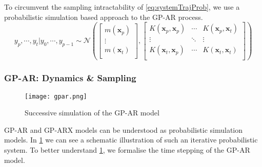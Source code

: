 To circumvent the sampling intractability of \cref{eq:systemTrajProb}, we use a probabilistic simulation based approach 
to the GP-AR process.
%
\begin{equation}\label{eq:systemTrajProb}
    y_{p}, \cdots, y_{t} \rvert y_{0}, \cdots, y_{p-1} \sim \mathcal{N}
    \left( 
        \begin{bmatrix}
            m(\mathbf{x}_{p})\\ 
            \vdots\\ 
            m(\mathbf{x}_{t})\\ 
        \end{bmatrix},
        \begin{bmatrix}
          K(\mathbf{x}_p, \mathbf{x}_p) & \cdots & K(\mathbf{x}_p, \mathbf{x}_t) \\
          \vdots & \ddots & \vdots \\
          K(\mathbf{x}_t, \mathbf{x}_p) & \cdots & K(\mathbf{x}_t, \mathbf{x}_t)\\
        \end{bmatrix}  
    \right) 
\end{equation}


\subsubsection*{GP-AR: Dynamics \& Sampling}

\begin{figure}[ht]
    \centering
    \noindent\texttt{[image: gpar.png]}
    \caption{Successive simulation of the GP-AR model}
    \label{fig:gparDiag}
\end{figure}


GP-AR and GP-ARX models can be understood as probabilistic simulation models. In \cref{fig:gparDiag} we can 
see a schematic illustration of such an iterative probabilistic system. To better understand \cref{fig:gparDiag}, 
we formalise the time stepping of the GP-AR model.

